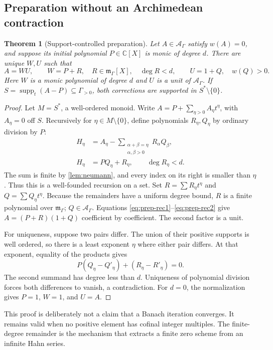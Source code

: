 \documentclass[11pt]{article}
\newtheorem{theorem}{Theorem}[section]
\theoremstyle{plain}
\theoremstyle{plain}
\theoremstyle{plain}
\theoremstyle{definition}
\theoremstyle{definition}
\theoremstyle{definition}
\theoremstyle{remark}
\newcommand{\C}{\mathbb C}\newcommand{\R}{\mathbb R}
\newcommand{\A}{\mathcal A_\Gamma}\newcommand{\OO}{\mathcal O_\Gamma}
\newcommand{\mm}{\mathfrak m_\Gamma}
\DeclareMathOperator{\supp}{supp}\DeclareMathOperator{\lc}{lc}
\begin{document}
\subsection{Preparation without an Archimedean contraction}
\begin{theorem}[Support-controlled preparation]\label{thm:prep}
Let $A\in\A$ satisfy $w(A)=0$, and suppose its initial polynomial
$P\in\C[X]$ is monic of degree $d$. There are unique $W,U$ such that
\[
 A=WU,\qquad
 W=P+R,\quad R\in\mm[X],\quad\deg R<d,\qquad
 U=1+Q,\quad w(Q)>0.
\]
Here $W$ is a monic polynomial of degree $d$ and $U$ is a unit of $\A$.
If $S=\supp_t(A-P)\subseteq\Gamma_{>0}$, both corrections are supported
in $S^*\setminus\{0\}$.
\end{theorem}
\begin{proof}
Let $M=S^*$, a well-ordered monoid. Write $A=P+\sum_{\eta>0}A_\eta t^\eta$,
with $A_\eta=0$ off $S$. Recursively for $\eta\in M\setminus\{0\}$,
define polynomials $R_\eta,Q_\eta$ by ordinary division by $P$:
\begin{align}
 H_\eta&=A_\eta-
   \sum_{\substack{\alpha+\beta=\eta\\\alpha,\beta>0}}
       R_\alpha Q_\beta,\label{eq:prep-rec1}\\
 H_\eta&=P Q_\eta+R_\eta,\qquad\deg R_\eta<d.
 \label{eq:prep-rec2}
\end{align}
The sum is finite by \cref{lem:neumann}, and every index on its right
is smaller than $\eta$. Thus this is a well-founded recursion on a set.
Set $R=\sum R_\eta t^\eta$ and $Q=\sum Q_\eta t^\eta$.
Because the remainders have a uniform degree bound, $R$ is a finite
polynomial over $\mm$; $Q\in\A$. Equations
\eqref{eq:prep-rec1}--\eqref{eq:prep-rec2} give $A=(P+R)(1+Q)$
coefficient by coefficient. The second factor is a unit.

For uniqueness, suppose two pairs differ. The union of their positive
supports is well ordered, so there is a least exponent $\eta$ where
either pair differs. At that exponent, equality of the products gives
\[
 P(Q_\eta-Q'_\eta)+(R_\eta-R'_\eta)=0.
\]
The second summand has degree less than $d$. Uniqueness of polynomial
division forces both differences to vanish, a contradiction. For $d=0$,
the normalization gives $P=1$, $W=1$, and $U=A$.
\end{proof}

This proof is deliberately not a claim that a Banach iteration converges.
It remains valid when no positive element has cofinal integer multiples.
The finite-degree remainder is the mechanism that extracts a finite zero
scheme from an infinite Hahn series.
\end{document}
